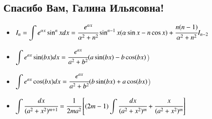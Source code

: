 \documentclass[twoside, a4paperpt, fleqn]{extarticle}
\begin{document}
\subsection*{Спасибо Вам, Галина Ильясовна!}
\begin{itemize}
    \item $I_{n}=\displaystyle \int e^{\alpha x} \sin ^{n} x d x=\cfrac{e^{\alpha x}}{\alpha^{2}+n^{2}} \sin ^{n-1} x(\alpha \sin x-n \cos x)+\cfrac{n(n-1)}{\alpha^{2}+n^{2}} I_{n-2}$
    \item $\displaystyle \int  e^{ax} \sin(bx) dx = \cfrac{e^{ax}}{a^2 + b^2} (a \sin(bx) - b \cos(bx)$)
    


    \item $\displaystyle \int  e^{ax} \cos(bx) dx = \cfrac{e^{ax}}{a^2 + b^2} (b \sin(bx) + a \cos(bx)$)
    \item $\displaystyle \int \cfrac{d x}{(a^2 + x^2)^{m+1}} = \cfrac{1}{2 m a^2} \left[ (2m - 1) \displaystyle \int \cfrac{d x} {(a^2 + x^2)^m} + \cfrac{x}{(a^2 + x^2)^m}\right]$
\end{itemize}
\end{document}
